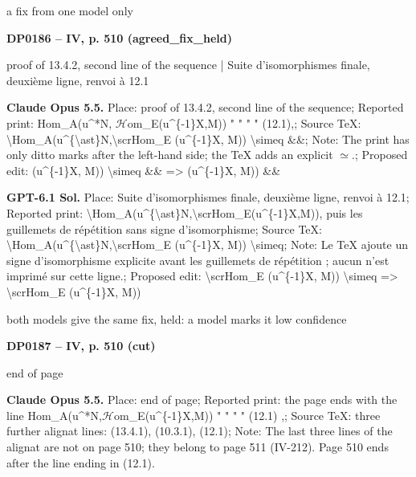 a fix from one model only\par
\par\noindent\hypertarget{DP0186}{}\textbf{DP0186 -- IV, p. 510 (agreed\_fix\_held)}\par
proof of 13.4.2, second line of the sequence | Suite d'isomorphismes finale, deuxième ligne, renvoi à 12.1\par
\textbf{Claude Opus 5.5.} Place: proof of 13.4.2, second line of the sequence; Reported print: Hom\_A(u\textasciicircum{}*N, \ensuremath{\mathcal{H}}om\_E(u\textasciicircum{}\{-1\}X,M))   "  "  "  "   (12.1),; Source TeX: \textbackslash{}Hom\_A(u\textasciicircum{}\{\textbackslash{}ast\}N,\textbackslash{}scrHom\_E (u\textasciicircum{}\{-1\}X, M)) \textbackslash{}simeq \&\&; Note: The print has only ditto marks after the left-hand side; the TeX adds an explicit \ensuremath{\simeq}.; Proposed edit: (u\textasciicircum{}\{-1\}X, M)) \textbackslash{}simeq \&\& =\allowbreak > (u\textasciicircum{}\{-1\}X, M)) \&\&\par
\textbf{GPT-6.1 Sol.} Place: Suite d'isomorphismes finale, deuxième ligne, renvoi à 12.1; Reported print: \textbackslash{}Hom\_A(u\textasciicircum{}\{\textbackslash{}ast\}N,\textbackslash{}scrHom\_E(u\textasciicircum{}\{-1\}X,M)), puis les guillemets de répétition sans signe d'isomorphisme; Source TeX: \textbackslash{}Hom\_A(u\textasciicircum{}\{\textbackslash{}ast\}N,\textbackslash{}scrHom\_E (u\textasciicircum{}\{-1\}X, M)) \textbackslash{}simeq; Note: Le TeX ajoute un signe d'isomorphisme explicite avant les guillemets de répétition ; aucun n'est imprimé sur cette ligne.; Proposed edit: \textbackslash{}scrHom\_E (u\textasciicircum{}\{-1\}X, M)) \textbackslash{}simeq =\allowbreak > \textbackslash{}scrHom\_E (u\textasciicircum{}\{-1\}X, M))\par
both models give the same fix, held: a model marks it low confidence\par
\par\noindent\hypertarget{DP0187}{}\textbf{DP0187 -- IV, p. 510 (cut)}\par
end of page\par
\textbf{Claude Opus 5.5.} Place: end of page; Reported print: the page ends with the line Hom\_A(u\textasciicircum{}*N,\ensuremath{\mathcal{H}}om\_E(u\textasciicircum{}\{-1\}X,M)) " " " " (12.1) ,; Source TeX: three further alignat lines: (13.4.1), (10.3.1), (12.1); Note: The last three lines of the alignat are not on page 510; they belong to page 511 (IV-212). Page 510 ends after the line ending in (12.1).\par
